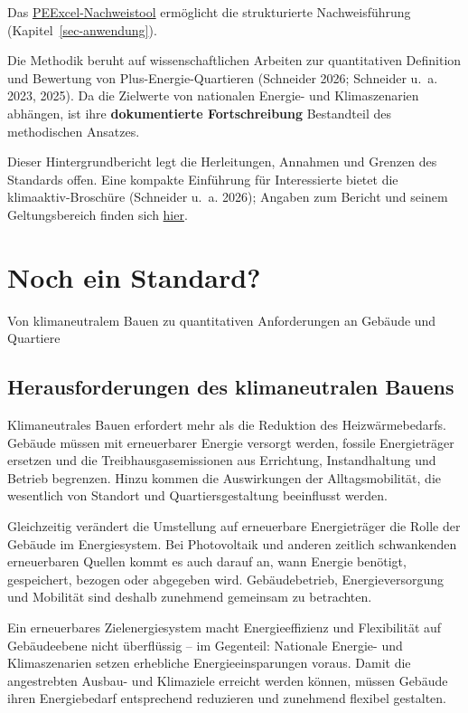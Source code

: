 \documentclass[
  ngerman,
  a4paper,
  DIV=11]{scrreprt}
\begin{document}

Das
\href{https://simonschaluppe.github.io/peexcel/}{PEExcel-Nachweistool}
ermöglicht die strukturierte Nachweisführung
(Kapitel~\ref{sec-anwendung}).

Die Methodik beruht auf wissenschaftlichen Arbeiten zur quantitativen
Definition und Bewertung von Plus-Energie-Quartieren (Schneider 2026;
Schneider u.~a. 2023, 2025). Da die Zielwerte von nationalen Energie-
und Klimaszenarien abhängen, ist ihre \textbf{dokumentierte
Fortschreibung} Bestandteil des methodischen Ansatzes.

Dieser Hintergrundbericht legt die Herleitungen, Annahmen und Grenzen
des Standards offen. Eine kompakte Einführung für Interessierte bietet
die klimaaktiv-Broschüre (Schneider u.~a. 2026); Angaben zum Bericht und
seinem Geltungsbereich finden sich \href{about.qmd}{hier}.


\chapter{Noch ein Standard?}\label{sec-einfuehrung}

Von klimaneutralem Bauen zu quantitativen Anforderungen an Gebäude und
Quartiere

\section{Herausforderungen des klimaneutralen
Bauens}\label{herausforderungen-des-klimaneutralen-bauens}

Klimaneutrales Bauen erfordert mehr als die Reduktion des
Heizwärmebedarfs. Gebäude müssen mit erneuerbarer Energie versorgt
werden, fossile Energieträger ersetzen und die Treibhausgasemissionen
aus Errichtung, Instandhaltung und Betrieb begrenzen. Hinzu kommen die
Auswirkungen der Alltagsmobilität, die wesentlich von Standort und
Quartiersgestaltung beeinflusst werden.

Gleichzeitig verändert die Umstellung auf erneuerbare Energieträger die
Rolle der Gebäude im Energiesystem. Bei Photovoltaik und anderen
zeitlich schwankenden erneuerbaren Quellen kommt es auch darauf an, wann
Energie benötigt, gespeichert, bezogen oder abgegeben wird.
Gebäudebetrieb, Energieversorgung und Mobilität sind deshalb zunehmend
gemeinsam zu betrachten.

Ein erneuerbares Zielenergiesystem macht Energieeffizienz und
Flexibilität auf Gebäudeebene nicht überflüssig -- im Gegenteil:
Nationale Energie- und Klimaszenarien setzen erhebliche
Energieeinsparungen voraus. Damit die angestrebten Ausbau- und
Klimaziele erreicht werden können, müssen Gebäude ihren Energiebedarf
entsprechend reduzieren und zunehmend flexibel gestalten.
\end{document}
